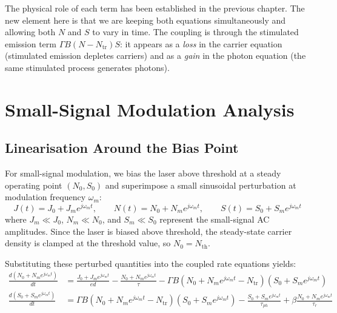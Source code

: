 The physical role of each term has been established in the previous chapter. The new element here is that we are keeping both equations simultaneously and allowing both $N$ and $S$ to vary in time. The coupling is through the stimulated emission term $\Gamma B(N - N_\text{tr})S$: it appears as a \emph{loss} in the carrier equation (stimulated emission depletes carriers) and as a \emph{gain} in the photon equation (the same stimulated process generates photons).

\section{Small-Signal Modulation Analysis}

\subsection{Linearisation Around the Bias Point}

For small-signal modulation, we bias the laser above threshold at a steady operating point $(N_0, S_0)$ and superimpose a small sinusoidal perturbation at modulation frequency $\omega_m$:
\begin{equation*}
    J(t) = J_0 + J_m e^{j\omega_m t}, \qquad N(t) = N_0 + N_m e^{j\omega_m t}, \qquad S(t) = S_0 + S_m e^{j\omega_m t}
\end{equation*}
where $J_m \ll J_0$, $N_m \ll N_0$, and $S_m \ll S_0$ represent the small-signal AC amplitudes. Since the laser is biased above threshold, the steady-state carrier density is clamped at the threshold value, so $N_0 = N_\text{th}$.

Substituting these perturbed quantities into the coupled rate equations yields:
\begin{align*}
    \frac{d(N_0 + N_m e^{j\omega_m t})}{dt} &= \frac{J_0 + J_m e^{j\omega_m t}}{ed} - \frac{N_0 + N_m e^{j\omega_m t}}{\tau} - \Gamma B\left(N_0 + N_m e^{j\omega_m t} - N_\text{tr}\right)\left(S_0 + S_m e^{j\omega_m t}\right) \\[6pt]
    \frac{d(S_0 + S_m e^{j\omega_m t})}{dt} &= \Gamma B\left(N_0 + N_m e^{j\omega_m t} - N_\text{tr}\right)\left(S_0 + S_m e^{j\omega_m t}\right) - \frac{S_0 + S_m e^{j\omega_m t}}{\tau_{ph}} + \beta\frac{N_0 + N_m e^{j\omega_m t}}{\tau_r}
\end{align*}

